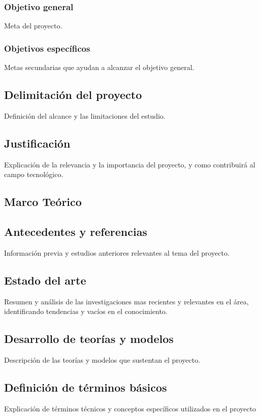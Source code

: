 \documentclass[12pt,letterpaper]{report}
\begin{document}
	

	


	\subsubsection{Objetivo general}
	Meta  del proyecto.
	\subsubsection{Objetivos específicos}
	Metas secundarias que ayudan a alcanzar el objetivo general.
	\subsection{Delimitación del proyecto}
	Definición del alcance y las limitaciones del estudio.
	\subsection{Justificación}
	Explicación de la relevancia y la importancia del proyecto, y como contribuirá al campo tecnológico.
	
	\newpage
	\begin{center}
	\section{Marco Teórico}
	\end{center}
	\subsection{Antecedentes y referencias}
	Información previa y estudios anteriores relevantes al tema del proyecto.
	\subsection{Estado del arte}
	Resumen y análisis de las investigaciones mas recientes y relevantes en el área, identificando tendencias y vacíos en el conocimiento.
	\subsection{Desarrollo de teorías y modelos}
	Descripción de las teorías y modelos que sustentan el proyecto.
	\subsection{Definición de términos básicos}
	Explicación de términos técnicos y conceptos específicos utilizados en el proyecto
	
\end{document}
